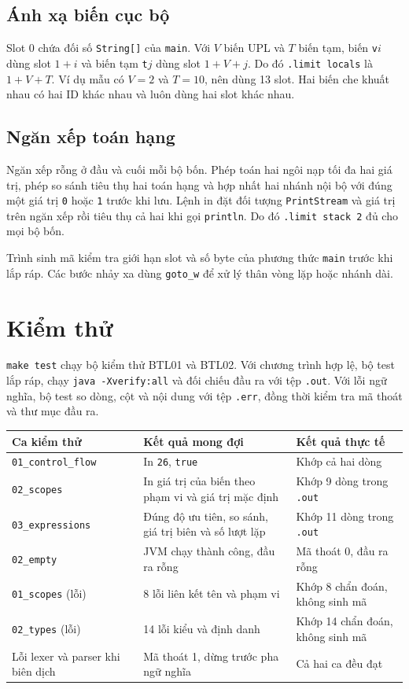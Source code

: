 \documentclass[11pt,a4paper]{article}
\begin{document}
\subsection{Ánh xạ biến cục bộ}

Slot 0 chứa đối số \texttt{String[]} của \texttt{main}. Với $V$ biến UPL
và $T$ biến tạm, biến \texttt{v}$i$ dùng slot $1+i$ và biến tạm
\texttt{t}$j$ dùng slot $1+V+j$. Do đó \texttt{.limit locals} là $1+V+T$.
Ví dụ mẫu có $V=2$ và $T=10$, nên dùng 13 slot. Hai biến che khuất nhau có hai
ID khác nhau và luôn dùng hai slot khác nhau.

\subsection{Ngăn xếp toán hạng}

Ngăn xếp rỗng ở đầu và cuối mỗi bộ bốn. Phép toán hai ngôi nạp tối đa hai
giá trị, phép so sánh tiêu thụ hai toán hạng và hợp nhất hai nhánh nội bộ với
đúng một giá trị \texttt{0} hoặc \texttt{1} trước khi lưu. Lệnh in đặt đối
tượng \texttt{PrintStream} và giá trị trên ngăn xếp rồi tiêu thụ cả hai khi gọi
\texttt{println}. Do đó \texttt{.limit stack 2} đủ cho mọi bộ bốn.

Trình sinh mã kiểm tra giới hạn slot và số byte của phương thức \texttt{main}
trước khi lắp ráp. Các bước nhảy xa dùng \texttt{goto\_w} để xử lý thân
vòng lặp hoặc nhánh dài.

\clearpage
\section{Kiểm thử}

\texttt{make test} chạy bộ kiểm thử BTL01 và BTL02. Với chương trình hợp lệ,
bộ test lắp ráp, chạy \texttt{java -Xverify:all} và đối chiếu đầu ra với
tệp \texttt{.out}. Với lỗi ngữ nghĩa, bộ test so dòng, cột và nội dung với tệp
\texttt{.err}, đồng thời kiểm tra mã thoát và thư mục đầu ra.

\begin{tabularx}{\linewidth}{@{}>{\raggedright\arraybackslash}p{4.4cm} X X@{}}
\toprule
\textbf{Ca kiểm thử} & \textbf{Kết quả mong đợi} & \textbf{Kết quả thực tế} \\
\midrule
\texttt{01\_control\_flow} & In \texttt{26}, \texttt{true} & Khớp cả hai dòng \\
\texttt{02\_scopes} & In giá trị của biến theo phạm vi và giá trị mặc định
  & Khớp 9 dòng trong \texttt{.out} \\
\texttt{03\_expressions} & Đúng độ ưu tiên, so sánh, giá trị biên và số lượt lặp
  & Khớp 11 dòng trong \texttt{.out} \\
\texttt{02\_empty} & JVM chạy thành công, đầu ra rỗng & Mã thoát 0, đầu ra rỗng \\
\texttt{01\_scopes} (lỗi) & 8 lỗi liên kết tên và phạm vi
  & Khớp 8 chẩn đoán, không sinh mã \\
\texttt{02\_types} (lỗi) & 14 lỗi kiểu và định danh
  & Khớp 14 chẩn đoán, không sinh mã \\
Lỗi lexer và parser khi biên dịch & Mã thoát 1, dừng trước pha ngữ nghĩa
  & Cả hai ca đều đạt \\
\bottomrule
\end{tabularx}
\end{document}
